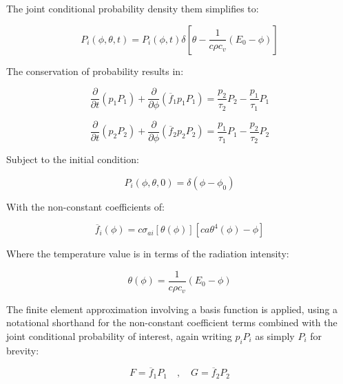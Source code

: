 \documentclass[12pt,a4paper,pagesize=pdftex]{scrartcl}
\begin{document}
The joint conditional probability density them simplifies to:

\begin{equation*}
    P_i\left(\phi, \theta, t\right) = P_i\left(\phi, t\right) \delta\left[\theta - \frac{1}{c \rho c_v} \left(E_0 - \phi\right)\right]
\end{equation*}

The conservation of probability results in:

\begin{equation*}
    \frac{\partial}{\partial t} \left(p_1 P_1\right) + \frac{\partial}{\partial \phi} \left(\overline{f}_1 p_1 P_1\right) = \frac{p_2}{\tau_2} P_2 - \frac{p_1}{\tau_1} P_1
\end{equation*}

\begin{equation*}
    \frac{\partial}{\partial t} \left(p_2 P_2\right) + \frac{\partial}{\partial \phi} \left(\overline{f}_2 p_2 P_2\right) = \frac{p_1}{\tau_1} P_1 - \frac{p_2}{\tau_2} P_2
\end{equation*}

Subject to the initial condition:

\begin{equation*}
    P_i \left(\phi, \theta, 0\right) = \delta\left(\phi - \phi_0\right)
\end{equation*}

With the non-constant coefficients of:

\begin{equation*}
    \overline{f}_i \left(\phi\right) = c \sigma_{ai} \left[\theta\left(\phi\right)\right] \left[c a \theta^4\left(\phi\right) - \phi\right]
\end{equation*}

Where the temperature value is in terms of the radiation intensity:

\begin{equation*}
    \theta\left(\phi\right) = \frac{1}{c \rho c_v} \left(E_0 - \phi\right)
\end{equation*}

The finite element approximation involving a basis function is applied, using a notational shorthand for the non-constant coefficient terms combined with the joint conditional probability of interest, again writing \(p_i P_i\) as simply \(P_i\) for brevity:

\begin{equation*}
    F = \overline{f}_1 P_1 \quad , \quad G = \overline{f}_2 P_2
\end{equation*}
\end{document}
